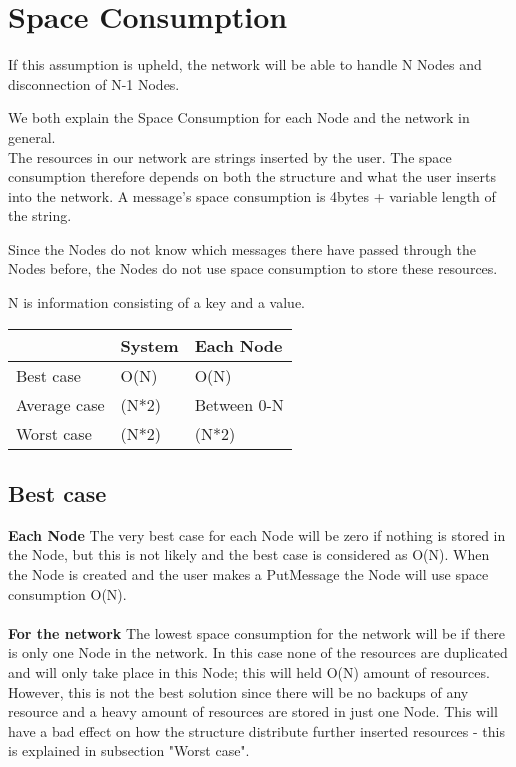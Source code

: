 \section{Space Consumption}
If this assumption is upheld, the network will be able to handle N Nodes and disconnection of N-1 Nodes.

We both explain the Space Consumption for each Node and the network in general.\\
The resources in our network are strings inserted by the user. The space consumption therefore depends on both the structure and what the user inserts into the network. A message's space consumption is 4bytes + variable length of the string. 

Since the Nodes do not know which messages there have passed through the Nodes before, the Nodes do not use space consumption to store these resources. 

N is information consisting of a key and a value.

\begin{center}
	\begin{tabular}{| l | l | l |}
		\hline
		  & System & Each Node \\ \hline
		Best case & O(N) & O(N) \\ \hline
		Average case & (N*2) & Between 0-N \\ \hline
		Worst case & (N*2) & (N*2) \\
		\hline
	\end{tabular}
\end{center}

\subsection{Best case}
\textbf{Each Node}
The very best case for each Node will be zero if nothing is stored in the Node, but this is not likely and the best case is considered as O(N). When the Node is created and the user makes a PutMessage the Node will use space consumption O(N).\\\\ \textbf{For the network}
The lowest space consumption for the network will be if there is only one Node in the network. In this case none of the resources are duplicated and will only take place in this Node; this will held O(N) amount of resources. \\ However, this is not the best solution since there will be no backups of any resource and a heavy amount of resources are stored in just one Node. This will have a bad effect on how the structure distribute further inserted resources - this is explained in subsection "Worst case". \\ 

